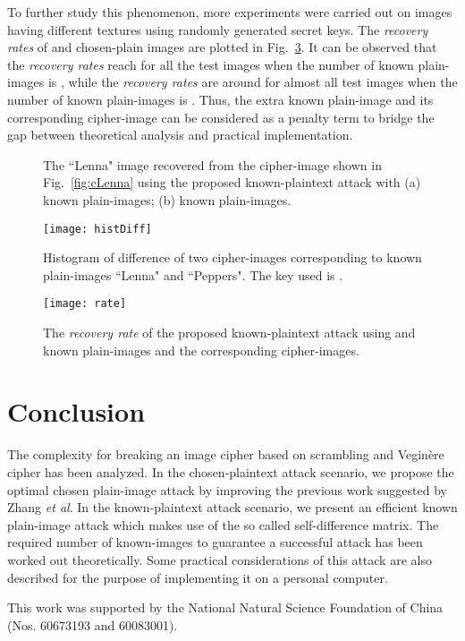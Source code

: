 \documentclass[smallextended, final]{svjour3}          \smartqed
\newlength\imagewidth
\begin{document}
To further study this phenomenon, more experiments were carried out on images having different textures using randomly generated secret keys.
The \textit{recovery rates} of  and  chosen-plain images are plotted in Fig.~\ref{fig:kpa2}.
It can be observed that the \textit{recovery rates} reach  for all the test images when the number of known plain-images is , while
the \textit{recovery rates} are around  for almost all test images when the number of known plain-images is . Thus, the extra known plain-image and its corresponding cipher-image
can be considered as a penalty term to bridge the gap between theoretical analysis and practical implementation.

\begin{figure}[!htb]
\centering
{}
\caption{The ``Lenna" image recovered from the cipher-image shown in Fig.~\ref{fig:cLenna} using the proposed known-plaintext attack with
(a)  known plain-images;
(b)  known plain-images.}
\label{fig:kpa}
\end{figure}


\begin{figure}[!htb]
\centering
\texttt{[image: histDiff]}
\caption{Histogram of difference of two cipher-images corresponding to known plain-images ``Lenna" and ``Peppers". The key used is .}
\label{fig:histCipher}
\end{figure}

\begin{figure}[!htb]
\centering
\texttt{[image: rate]}
\caption{The \textit{recovery rate} of the proposed known-plaintext attack using  and  known plain-images and the corresponding cipher-images.}
\label{fig:kpa2}
\end{figure}

\section{Conclusion}
The complexity for breaking an image cipher based on scrambling and Vegin{\`e}re cipher has been analyzed.
In the chosen-plaintext attack scenario, we propose the optimal chosen plain-image attack by improving the previous work suggested by Zhang \textit{et al}.
In the known-plaintext attack scenario, we present an efficient known plain-image attack which makes use of the so called self-difference matrix. The required number of known-images
to guarantee a successful attack has been worked out theoretically. Some practical considerations of this attack are also described for the purpose of
implementing it on a personal computer.

\begin{acknowledgements}
This work was supported by the National Natural Science Foundation of China (Nos. 60673193 and 60083001).
\end{acknowledgements}



\end{document}
